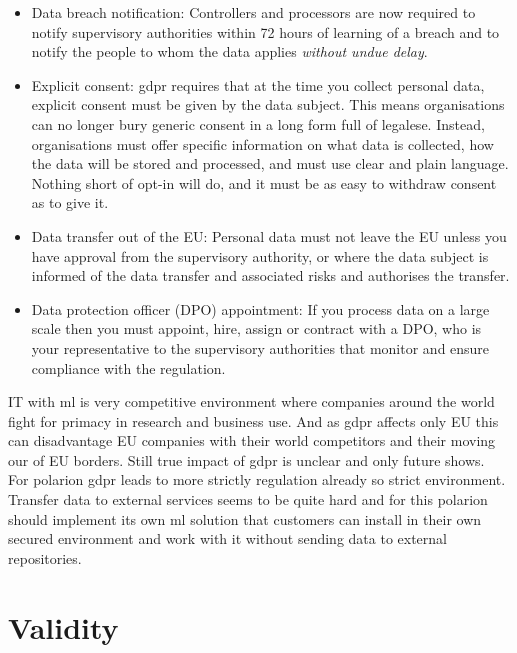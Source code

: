 \documentclass[thesis=M,english]{FITthesis}[2012/06/26]
\begin{document}
\begin{itemize}[nosep]
\item Data breach notification: Controllers and processors are now required to notify supervisory authorities within 72 hours of learning of a breach and to notify the people to whom the data applies \textit{without undue delay}. 
\item Explicit consent: \acrshort{gdpr} requires that at the time you collect personal data, explicit consent must be given by the data subject. This means organisations can no longer bury generic consent in a long form full of legalese. Instead, organisations must offer specific information on what data is collected, how the data will be stored and processed, and must use clear and plain language. Nothing short of opt-in will do, and it must be as easy to withdraw consent as to give it. 
\item Data transfer out of the EU: Personal data must not leave the EU unless you have approval from the supervisory authority, or where the data subject is informed of the data transfer and associated risks and authorises the transfer. 
\item Data protection officer (DPO) appointment: If you process data on a large scale then you must appoint, hire, assign or contract with a DPO, who is your representative to the supervisory authorities that monitor and ensure compliance with the regulation.\\
\end{itemize}

\pagebreak
IT with \acrshort{ml} is very competitive environment where companies around the world fight for primacy in research and business use. And as \acrshort{gdpr} affects only EU this can disadvantage EU companies with their world competitors and their moving our of EU borders. Still true impact of \acrshort{gdpr} is unclear and only future shows.\\

For \acrfull{polarion} \acrshort{gdpr} leads to more strictly regulation already so strict environment. Transfer data to external services seems to be quite hard and for this \acrshort{polarion} should implement its own \acrshort{ml} solution that customers can install in their own secured environment and work with it without sending data to external repositories.


\chapter{Validity}
\end{document}
